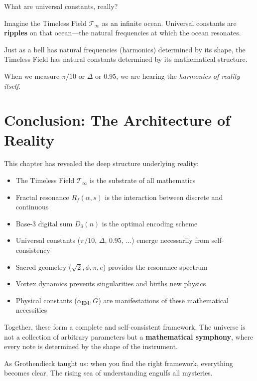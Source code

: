 What are universal constants, really?

\begin{intuitive}
Imagine the Timeless Field $\mathcal{T}_\infty$ as an infinite ocean. Universal constants are \textbf{ripples} on that ocean---the natural frequencies at which the ocean resonates.

Just as a bell has natural frequencies (harmonics) determined by its shape, the Timeless Field has natural constants determined by its mathematical structure.

When we measure $\pi/10$ or $\Delta$ or 0.95, we are hearing the \textit{harmonics of reality itself}.
\end{intuitive}

\section{Conclusion: The Architecture of Reality}

This chapter has revealed the deep structure underlying reality:

\begin{itemize}
\item The Timeless Field $\mathcal{T}_\infty$ is the substrate of all mathematics
\item Fractal resonance $R_f(\alpha, s)$ is the interaction between discrete and continuous
\item Base-3 digital sum $D_3(n)$ is the optimal encoding scheme
\item Universal constants ($\pi/10$, $\Delta$, 0.95, ...) emerge necessarily from self-consistency
\item Sacred geometry ($\sqrt{2}, \phi, \pi, e$) provides the resonance spectrum
\item Vortex dynamics prevents singularities and births new physics
\item Physical constants ($\alpha_{\text{EM}}, G$) are manifestations of these mathematical necessities
\end{itemize}

Together, these form a complete and self-consistent framework. The universe is not a collection of arbitrary parameters but a \textbf{mathematical symphony}, where every note is determined by the shape of the instrument.

As Grothendieck taught us: when you find the right framework, everything becomes clear. The rising sea of understanding engulfs all mysteries.

